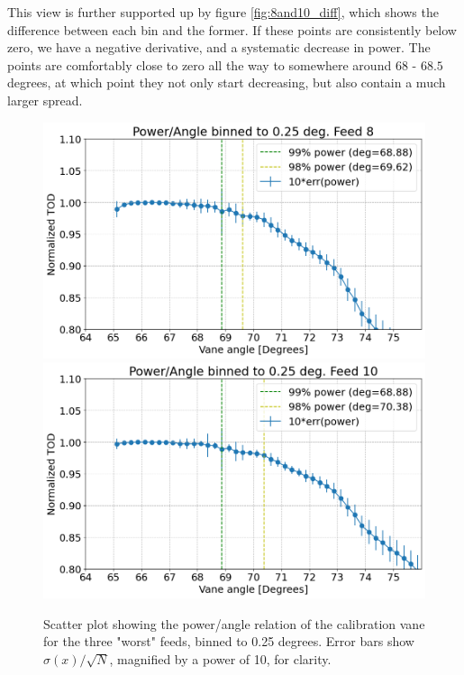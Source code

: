 \documentclass[10pt, a4paper]{article}
\begin{document}
This view is further supported up by figure \ref{fig:8and10_diff}, which shows the difference between each bin and the former. If these points are consistently below zero, we have a negative derivative, and a systematic decrease in power. The points are comfortably close to zero all the way to somewhere around $68$ - $68.5$ degrees, at which point they not only start decreasing, but also contain a much larger spread. 


\vspace{1cm}
\begin{figure}[h!]
    \centering
    \includegraphics[scale=0.36]{../plots/binned8.png}
    \includegraphics[scale=0.36]{../plots/binned10.png}
    \caption{Scatter plot showing the power/angle relation of the calibration vane for the three "worst" feeds, binned to 0.25 degrees. Error bars show $\sigma(x)/\sqrt{N}$, magnified by a power of 10, for clarity.}
    \label{fig:8and10}
\end{figure}
\end{document}
